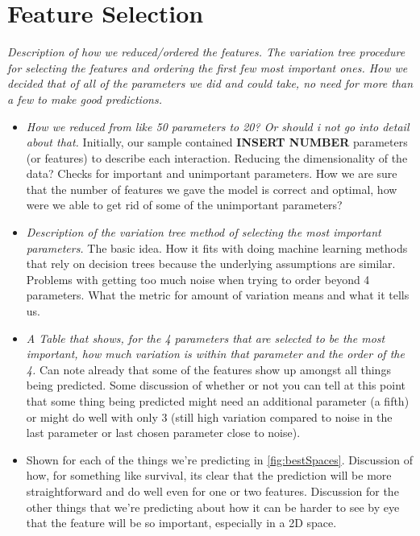 \documentclass[fleqn,usenatbib]{mnras}
\begin{document}
\section{Feature Selection}
\label{sec:feature selection} %
\textit{Description of how we reduced/ordered the features. The variation tree procedure for selecting the features and ordering the first few most important ones. How we decided that of all of the parameters we did and could take, no need for more than a few to make good predictions.}
\begin{itemize}
    \item \textit{How we reduced from like 50 parameters to 20? Or should i not go into detail about that.} Initially, our sample contained \textbf{INSERT NUMBER} parameters (or features) to describe each interaction. Reducing the dimensionality of the data? Checks for important and unimportant parameters. How we are sure that the number of features we gave the model is correct and optimal, how were we able to get rid of some of the unimportant parameters?
    \item \textit{Description of the variation tree method of selecting the most important parameters.} The basic idea. How it fits with doing machine learning methods that rely on decision trees because the underlying assumptions are similar. Problems with getting too much noise when trying to order beyond 4 parameters. What the metric for amount of variation means and what it tells us.
    \item \textit{A Table that shows, for the 4 parameters that are selected to be the most important, how much variation is within that parameter and the order of the 4.} Can note already that some of the features show up amongst all things being predicted. Some discussion of whether or not you can tell at this point that some thing being predicted might need an additional parameter (a fifth) or might do well with only 3 (still high variation compared to noise in the last parameter or last chosen parameter close to noise).
    \item {} Shown for each of the things we're predicting in \ref{fig:bestSpaces}. Discussion of how, for something like survival, its clear that the prediction will be more straightforward and do well even for one or two features. Discussion for the other things that we're predicting about how it can be harder to see by eye that the feature will be so important, especially in a 2D space.
\end{itemize}
\end{document}
